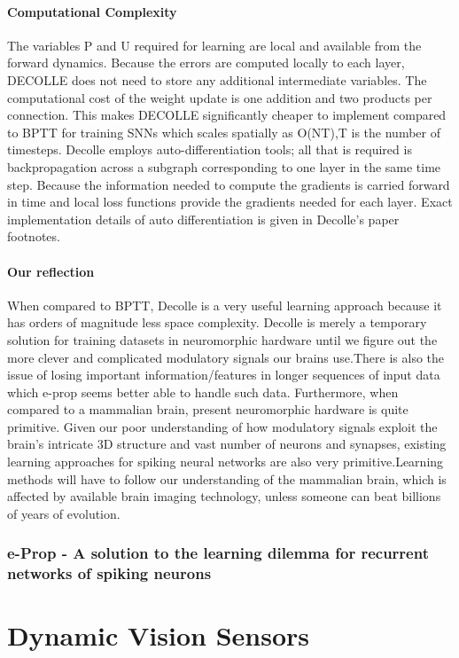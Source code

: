 \documentclass[12pt]{report}
\begin{document}
\subsubsection{Computational Complexity}
The variables P and U required for learning are local and available from the forward dynamics. Because the errors are computed locally to each layer, DECOLLE does not need to store any additional intermediate variables.  The computational cost of the weight update is one addition and two products per connection. This makes DECOLLE significantly cheaper to implement compared to BPTT for training SNNs which scales spatially as O(NT),T is the number of timesteps. Decolle employs auto-differentiation tools; all that is required is backpropagation across a subgraph corresponding to one layer in the same time step. Because the information needed to compute the gradients is carried forward in time and local loss functions provide the gradients needed for each layer. Exact implementation details of auto differentiation is given in Decolle's paper footnotes.
\subsubsection{Our reflection}
When compared to BPTT, Decolle is a very useful learning approach because it has orders of magnitude less space complexity. Decolle is merely a temporary solution for training datasets in neuromorphic hardware until we figure out the more clever and complicated modulatory signals our brains use.There is also the issue of losing important information/features in longer sequences of input data which e-prop seems better able to handle such data. Furthermore, when compared to a mammalian brain, present neuromorphic hardware is quite primitive. Given our poor understanding of how modulatory signals exploit the brain's intricate 3D structure and vast number of neurons and synapses, existing learning approaches for spiking neural networks are also very primitive.Learning methods will have to follow our understanding of the mammalian brain, which is affected by available brain imaging technology, unless someone can beat billions of years of evolution.




\subsection{e-Prop - A solution to the learning dilemma for recurrent networks of spiking neurons}

\chapter{Dynamic Vision Sensors}
\end{document}
